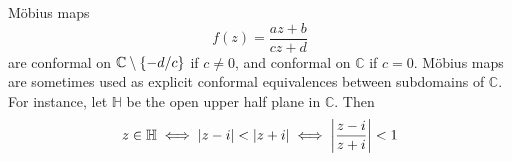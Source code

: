 \begin{example}
	M\"obius maps
	\[ f(z) = \frac{az+b}{cz+d} \]
	are conformal on \( \mathbb C \setminus \qty{-d/c} \) if \( c \neq 0 \), and conformal on \( \mathbb C \) if \( c = 0 \).
	M\"obius maps are sometimes used as explicit conformal equivalences between subdomains of \( \mathbb C \).
	For instance, let \( \mathbb H \) be the open upper half plane in \( \mathbb C \).
	Then
	\[ z \in \mathbb H \iff \abs{z - i} < \abs{z + i} \iff \abs{\frac{z - i}{z + i}} < 1 \]
\end{example}
